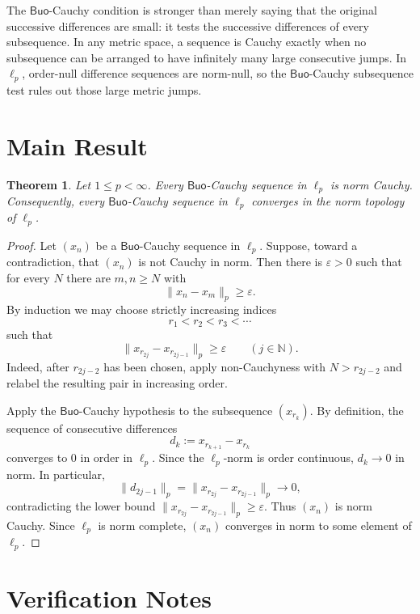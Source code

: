 \documentclass[11pt]{article}
\newtheorem{theorem}{Theorem}
\newcommand{\Buo}{\mathsf{Buo}}
\begin{document}
The \(\Buo\)-Cauchy condition is stronger than merely saying that the original
successive differences are small: it tests the successive differences of every
subsequence.  In any metric space, a sequence is Cauchy exactly when no
subsequence can be arranged to have infinitely many large consecutive jumps.
In \(\ell_p\), order-null difference sequences are norm-null, so the
\(\Buo\)-Cauchy subsequence test rules out those large metric jumps.

\section*{Main Result}

\begin{theorem}
Let \(1\le p<\infty\).  Every \(\Buo\)-Cauchy sequence in \(\ell_p\) is norm
Cauchy.  Consequently, every \(\Buo\)-Cauchy sequence in \(\ell_p\) converges
in the norm topology of \(\ell_p\).
\end{theorem}

\begin{proof}
Let \((x_n)\) be a \(\Buo\)-Cauchy sequence in \(\ell_p\).  Suppose, toward a
contradiction, that \((x_n)\) is not Cauchy in norm.  Then there is
\(\varepsilon>0\) such that for every \(N\) there are \(m,n\ge N\) with
\[
        \|x_n-x_m\|_p\ge \varepsilon .
\]
By induction we may choose strictly increasing indices
\[
        r_1<r_2<r_3<\cdots
\]
such that
\[
        \|x_{r_{2j}}-x_{r_{2j-1}}\|_p\ge \varepsilon
        \qquad (j\in\mathbb N).
\]
Indeed, after \(r_{2j-2}\) has been chosen, apply non-Cauchyness with
\(N>r_{2j-2}\) and relabel the resulting pair in increasing order.

Apply the \(\Buo\)-Cauchy hypothesis to the subsequence \((x_{r_k})\).  By
definition, the sequence of consecutive differences
\[
        d_k:=x_{r_{k+1}}-x_{r_k}
\]
converges to \(0\) in order in \(\ell_p\).  Since the \(\ell_p\)-norm is order
continuous, \(d_k\to0\) in norm.  In particular,
\[
        \|d_{2j-1}\|_p
        =\|x_{r_{2j}}-x_{r_{2j-1}}\|_p
        \longrightarrow 0,
\]
contradicting the lower bound \(\|x_{r_{2j}}-x_{r_{2j-1}}\|_p\ge\varepsilon\).
Thus \((x_n)\) is norm Cauchy.  Since \(\ell_p\) is norm complete, \((x_n)\)
converges in norm to some element of \(\ell_p\).
\end{proof}

\section*{Verification Notes}
\end{document}
